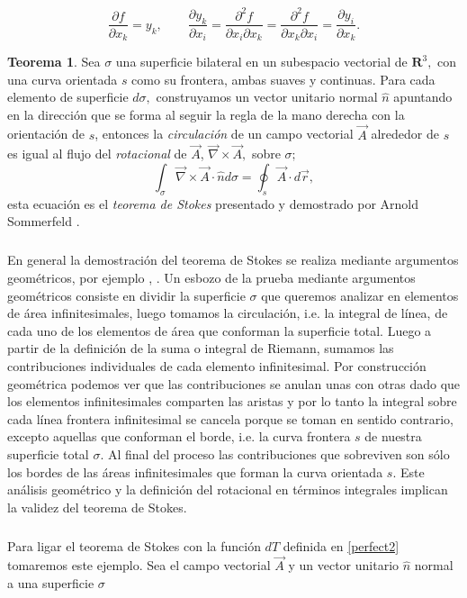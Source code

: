 \documentclass{article}
\theoremstyle{definition} \newtheorem{defi}{Definici\'on}
\theoremstyle{definition} \newtheorem{teo}{Teorema}
\theoremstyle{definition} \newtheorem{cor}{Corolario}
\begin{document}
\begin{equation}
\frac{\partial f}{\partial x_k} = y_k, \qquad \frac{\partial y_k}{\partial x_i} = \frac{\partial^2 f}{\partial x_i\partial x_k}= \frac{\partial^2 f}{\partial x_k\partial x_i} = \frac{\partial y_i}{\partial x_k}.
\end{equation}
\begin{teo}
Sea $\sigma$ una superficie bilateral en un subespacio vectorial de $\mathbf{R}^3,$ con una curva orientada $s$ como su frontera, ambas suaves y continuas. Para cada elemento de superficie $d\sigma,$ construyamos un vector unitario normal $\hat{n}$ apuntando en la direcci\'on que se forma al seguir la regla de la mano derecha con la orientaci\'on de $s$, entonces la \emph{circulaci\'on} de un campo vectorial $\vec A$ alrededor de $s$ es igual al flujo del \emph{rotacional} de $\vec A$, $\vec \nabla \times \vec A,$ sobre $\sigma;$
\begin{equation}\label{Stokes}
\int_{\sigma}  \vec \nabla \times \vec A \cdot \hat{n} d\sigma = \oint_s \vec A \cdot d\vec r,
\end{equation}
esta ecuaci\'on es el \emph{teorema de Stokes} presentado y demostrado por Arnold Sommerfeld \cite{AS2}.
\end{teo}
\subparagraph{}
En general la demostraci\'on del teorema de Stokes se realiza mediante argumentos geom\'etricos, por ejemplo \cite{AR}, \cite{HI}. Un esbozo de la prueba mediante argumentos geom\'etricos consiste en dividir la superficie $\sigma$ que queremos analizar en elementos de \'area infinitesimales, luego tomamos la circulaci\'on, i.e. la integral de l\'inea, de cada uno de los elementos de \'area que conforman la superficie total. Luego a partir de la definici\'on de la suma o integral de Riemann, sumamos las contribuciones individuales de cada elemento infinitesimal. Por construcci\'on geom\'etrica podemos ver que las contribuciones se anulan unas con otras dado que los elementos infinitesimales comparten las aristas y por lo tanto la integral sobre cada l\'inea frontera infinitesimal se cancela porque se toman en sentido contrario, excepto aquellas que conforman el borde, i.e. la curva frontera $s$ de nuestra superficie total $\sigma.$ Al final del proceso las contribuciones que sobreviven son s\'olo los bordes de las \'areas infinitesimales que forman la curva orientada $s.$ Este an\'alisis geom\'etrico y la definici\'on del rotacional en t\'erminos integrales implican la validez del teorema de Stokes.
\subparagraph{}
Para ligar el teorema de Stokes con la funci\'on $dT$ definida en \eqref{perfect2} tomaremos este ejemplo. Sea el campo vectorial $\vec A$ y un vector unitario $\hat n$ normal a una superficie $\sigma$
\end{document}
